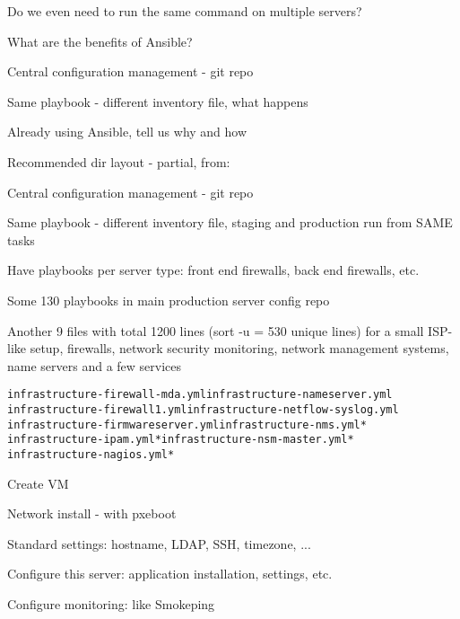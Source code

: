 \documentclass[18pt,landscape,a4paper,footrule]{foils}
\begin{document}

Do we even need to run the same command on multiple servers?

What are the benefits of Ansible?
\begin{list2}
\item Central configuration management - git repo
\item Same playbook - different inventory file, what happens
\item Already using Ansible, tell us why and how
\end{list2}



Recommended dir layout - partial, from:\\


\begin{list2}
\item Central configuration management - git repo
\item Same playbook - different inventory file, staging and production run from SAME tasks
\item Have playbooks per server type: front end firewalls, back end firewalls, etc.
\item Some 130 playbooks in main production server config repo
\item Another 9 files with total 1200 lines (sort -u = 530 unique lines) for a small ISP-like setup, firewalls, network security monitoring, network management systems, name servers and a few services
\begin{alltt}
infrastructure-firewall-mda.yml		infrastructure-nameserver.yml
infrastructure-firewall1.yml		infrastructure-netflow-syslog.yml
infrastructure-firmwareserver.yml	infrastructure-nms.yml*
infrastructure-ipam.yml*		infrastructure-nsm-master.yml*
infrastructure-nagios.yml*
\end{alltt}
\end{list2}


\begin{list2}
\item Create VM
\item Network install - with pxeboot
\item Standard settings: hostname, LDAP, SSH, timezone,  ...
\item Configure this server: application installation, settings, etc.
\item Configure monitoring: like Smokeping
\end{list2}
\end{document}
